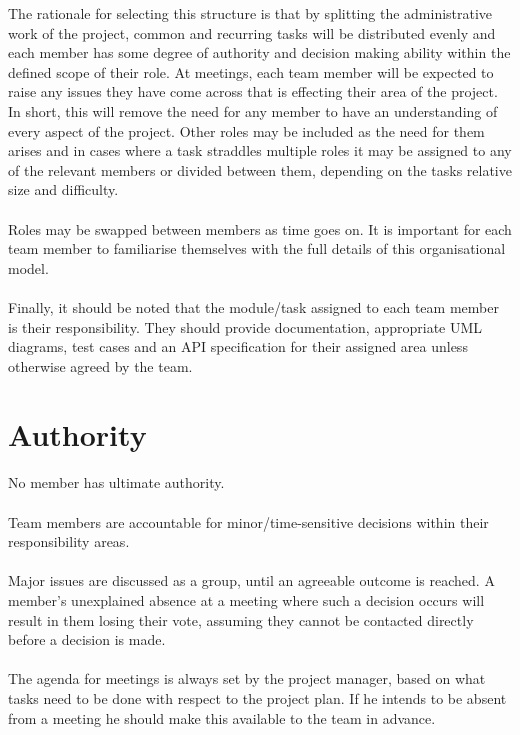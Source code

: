 \documentclass{l3deliverable}
\begin{document}
The rationale for selecting this structure is that by splitting the administrative work of the project, common and recurring tasks will be distributed evenly and each member has some degree of authority and decision making ability within the defined scope of their role. At meetings, each team member will be expected to raise any issues they have come across that is effecting their area of the project. In short, this will remove the need for any member to have an understanding of every aspect of the project.
Other roles may be included as the need for them arises and in cases where a task straddles multiple roles it may be assigned to any of the relevant members or divided between them, depending on the tasks relative size and difficulty.\\
\\
Roles may be swapped between members as time goes on. It is important for each team member to familiarise themselves with the full details of this organisational model. \\
\\
Finally, it should be noted that the module/task assigned to each team member is their responsibility. They should provide documentation, appropriate UML diagrams, test cases and an API specification for their assigned area unless otherwise agreed by the team.



\section{Authority}

No member has ultimate authority. \\
\\
Team members are accountable for minor/time-sensitive decisions within their responsibility areas.\\
\\
Major issues are discussed as a group, until an agreeable outcome is reached. A member's unexplained absence at a meeting where such a decision occurs will result in them losing their vote, assuming they cannot be contacted directly before a decision is made.\\
\\
The agenda for meetings is always set by the project manager, based on what tasks need to be done with respect to the project plan. If he intends to be absent from a meeting he should make this available to the team in advance.
\end{document}
